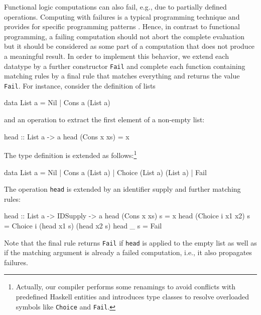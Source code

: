 \documentclass{llncs}
\newcommand{\code}[1]{\mbox{\small\texttt{#1}}}
\begin{document}
Functional logic computations can also fail, e.g.,
due to partially defined operations.
Computing with failures is a typical programming technique
and provides for specific programming patterns \cite{AntoyHanus02FLOPS}.
Hence, in contrast to functional programming,
a failing computation should not abort the complete evaluation
but it should be considered as some part of a computation that
does not produce a meaningful result.
In order to implement this behavior, we extend
each datatype by a further constructor \code{Fail}
and complete each function containing matching rules
by a final rule that matches everything and returns the value \code{Fail}.
For instance, consider the definition of lists
\begin{curry}
  data List a = Nil | Cons a (List a)
\end{curry}
and an operation to extract the first element of a non-empty list:
\begin{curry}
  head :: List a -> a
  head (Cons x xs) = x
\end{curry}
The type definition is extended as follows:\footnote{Actually,
our compiler performs some renamings to avoid conflicts with
predefined Haskell entities and introduces type classes
to resolve overloaded symbols like \code{Choice} and \code{Fail}.}
\begin{haskell}
  data List a = Nil | Cons a (List a) | Choice (List a) (List a) | Fail
\end{haskell}
The operation \code{head} is extended by an identifier supply
and further matching rules:
\begin{haskell}
  head :: List a -> IDSupply -> a
  head (Cons x xs)      s = x
  head (Choice i x1 x2) s = Choice i (head x1 s) (head x2 s)
  head _                s = Fail
\end{haskell}
Note that the final rule returns \code{Fail} if \code{head} is
applied to the empty list as well as if the matching argument
is already a failed computation, i.e., it also propagates failures.
\end{document}
